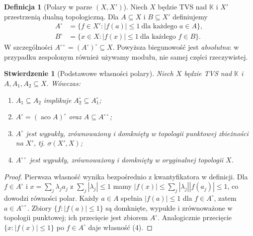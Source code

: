\documentclass[11pt,a4paper]{article}
\numberwithin{equation}{section}
\theoremstyle{plain}
\newtheorem{stwierdzenie}[twierdzenie]{Stwierdzenie}
\theoremstyle{definition}
\newtheorem{definicja}[twierdzenie]{Definicja}
\theoremstyle{remark}
\newcommand{\K}{\mathbb K}
\begin{document}
\begin{definicja}[Polary w parze $(X,X')$]\label{def:polar}
Niech $X$ będzie TVS nad $\K$ i $X'$ przestrzenią dualną topologiczną.
Dla $A\subseteq X$ i $B\subseteq X'$ definiujemy
\[
 \begin{aligned}
 A^\circ&=\{f\in X':|f(a)|\le1\ \text{dla każdego }a\in A\},\\
 B^\circ&=\{x\in X:|f(x)|\le1\ \text{dla każdego }f\in B\}.
 \end{aligned}
\]
W szczególności $A^{\circ\circ}=(A^\circ)^\circ\subseteq X$.
Powyższa biegunowość jest \emph{absolutna}: w przypadku
zespolonym również używamy modułu, nie samej części rzeczywistej.
\end{definicja}

\begin{stwierdzenie}[Podstawowe własności polary]\label{prop:polar-properties}
Niech $X$ będzie TVS nad $\K$ i $A,A_1,A_2\subseteq X$.
Wówczas:
\begin{enumerate}
\item $A_1\subseteq A_2$ implikuje $A_2^\circ\subseteq A_1^\circ$;
\item $A^\circ=(\operatorname{aco}A)^\circ$ oraz
      $A\subseteq A^{\circ\circ}$;
\item $A^\circ$ jest wypukły, zrównoważony i domknięty
      w topologii punktowej zbieżności na $X'$, tj. $\sigma(X',X)$;
\item $A^{\circ\circ}$ jest wypukły, zrównoważony i domknięty
      w oryginalnej topologii $X$.
\end{enumerate}
\end{stwierdzenie}
\begin{proof}
Pierwsza własność wynika bezpośrednio z kwantyfikatora
w definicji. Dla $f\in A^\circ$ i
$x=\sum_j\lambda_j a_j$ z $\sum_j|\lambda_j|\le1$
mamy $|f(x)|\le\sum_j|\lambda_j||f(a_j)|\le1$,
co dowodzi równości polar. Każdy $a\in A$ spełnia
$|f(a)|\le1$ dla $f\in A^\circ$, zatem $a\in A^{\circ\circ}$.
Zbiory $\{f:|f(a)|\le1\}$ są domknięte, wypukłe i
zrównoważone w topologii punktowej; ich przecięcie
jest zbiorem $A^\circ$. Analogicznie przecięcie
$\{x:|f(x)|\le1\}$ po $f\in A^\circ$ daje własność (4).
\end{proof}
\end{document}
